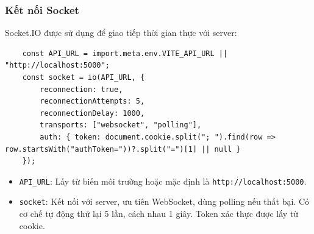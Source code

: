             \subsubsection{Kết nối Socket}
                \hspace*{0.6cm}Socket.IO được sử dụng để giao tiếp thời gian thực với server:
                \begin{lstlisting}
    const API_URL = import.meta.env.VITE_API_URL || "http://localhost:5000";
    const socket = io(API_URL, {
        reconnection: true,
        reconnectionAttempts: 5,
        reconnectionDelay: 1000,
        transports: ["websocket", "polling"],
        auth: { token: document.cookie.split("; ").find(row => row.startsWith("authToken="))?.split("=")[1] || null }
    });
                \end{lstlisting}
                \begin{itemize}
                    \item \texttt{API\_URL}: Lấy từ biến môi trường hoặc mặc định là \texttt{http://localhost:5000}.
                    \item \texttt{socket}: Kết nối với server, ưu tiên WebSocket, dùng polling nếu thất bại. Có cơ chế tự động thử lại 5 lần, cách nhau 1 giây. Token xác thực được lấy từ cookie.
                \end{itemize}

